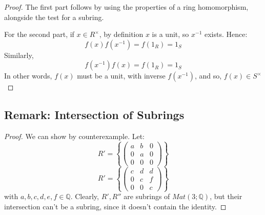 \documentclass{exam}
\begin{document}
\begin{proof}

The first part follows by using the properties of a ring homomorphism, alongside the test for a subring.

\bigskip

For the second part, if $x \in R^\times$, by definition $x$ is a unit, so $x^{-1}$ exists. Hence:
\[
f(x)f(x^{-1}) = f(1_R) = 1_S
\]
Similarly,
\[
f(x^{-1})f(x) = f(1_R) = 1_S
\]
In other words, $f(x)$ must be a unit, with inverse $f(x^{-1})$, and so, $f(x) \in S^\times$

\end{proof}

\subsection{Remark: Intersection of Subrings}


\begin{proof}

We can show by counterexample. Let:
\[
R' = \left\{ \begin{pmatrix}
a & b & 0 \\
0 & a & 0 \\
0 & 0 & 0
\end{pmatrix} \right\}
\]
\[
R' = \left\{ \begin{pmatrix}
c & d & d \\
0 & c & f \\
0 & 0 & c
\end{pmatrix} \right\}
\]
with $a,b,c,d,e,f \in \mathbb{Q}$. Clearly, $R',R''$ are subrings of $Mat(3; \mathbb{Q})$, but their intersection can't be a subring, since it doesn't contain the identity.

\end{proof}
\end{document}
